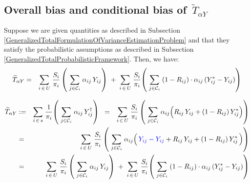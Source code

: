 
\vskip 1.0cm
\subsection{Overall bias and conditional bias of \,$\widetilde{T}_{\alpha Y}$}
\setcounter{theorem}{0}


\vskip 0.1cm
\begin{lemma}
\mbox{}
\vskip 0.1cm
\noindent
Suppose we are given quantities as described in Subsection
\ref{GeneralizedTotalFormulationOfVarianceEstimationProblem}
and
that they satisfy the probabilistic assumptions as described in Subsection
\ref{GeneralizedTotalProbabilisticFramework}.
\vskip 0.1cm
\noindent
Then, we have:
\begin{eqnarray*}
\widetilde{T}_{\alpha Y}
& = &
    \underset{i\,\in\,U}{\sum}\;
        \dfrac{S_{i}}{\pi_{i}}
        \left(\;
            \underset{j \in \mathcal{C}_{i}}{\sum}\;\alpha_{ij}\,Y_{ij}
            \right)
    \; + \;
    \underset{i\,\in\,U}{\sum}\;
        \dfrac{S_{i}}{\pi_{i}}\!
        \left(\;
            \underset{j \in \mathcal{C}_{i}}{\sum}\;
            (1 \overset{{\color{white}.}}{-} R_{ij})
            \cdot
            \alpha_{ij}\,
            (Y^{*}_{ij} \overset{{\color{white}.}}{-} Y_{ij})
            \right)
\end{eqnarray*}
\end{lemma}
\proof
\begin{eqnarray*}
\widetilde{T}_{\alpha Y}
& := &
    \underset{i\,\in\,s}{\sum}\;
    \dfrac{1}{\pi_{i}}\!
    \left(\;
        \underset{j \in \mathcal{C}_{i}}{\sum}\;\alpha_{ij}\,Y^{\dagger}_{ij}
        \right)
\;\; = \;\;\,
    \underset{i\,\in\,U}{\sum}\;
        \dfrac{S_{i}}{\pi_{i}}
        \left(\;
            \underset{j \in \mathcal{C}_{i}}{\sum}\;\alpha_{ij}\!
            \left(
                R_{ij}\,Y_{ij}
                \overset{{\color{white}.}}{+}
                (1-R_{ij})\,Y^{*}_{ij}
                \right)
            \right)
\\
& = &
    \underset{i\,\in\,U}{\sum}\;
        \dfrac{S_{i}}{\pi_{i}}
        \left(\;
            \underset{j \in \mathcal{C}_{i}}{\sum}\;\alpha_{ij}\!
            \left(\,
                {\color{blue}
                Y_{ij}
                \overset{{\color{white}.}}{-}
                Y_{ij}
                }
                \overset{{\color{white}.}}{+}
                R_{ij}\,Y_{ij}
                \overset{{\color{white}.}}{+}
                (1-R_{ij})\,Y^{*}_{ij}
                \,\right)
            \right)
\\
& = &
    \underset{i\,\in\,U}{\sum}\;
        \dfrac{S_{i}}{\pi_{i}}
        \left(\;
            \underset{j \in \mathcal{C}_{i}}{\sum}\;\alpha_{ij}\,Y_{ij}
            \right)
    \; + \;
    \underset{i\,\in\,U}{\sum}\;
        \dfrac{S_{i}}{\pi_{i}}\!
        \left(\;
            \underset{j \in \mathcal{C}_{i}}{\sum}\;
            (1 \overset{{\color{white}.}}{-} R_{ij})
            \cdot
            \alpha_{ij}\,
            (Y^{*}_{ij} \overset{{\color{white}.}}{-} Y_{ij})
            \right)
\end{eqnarray*}

